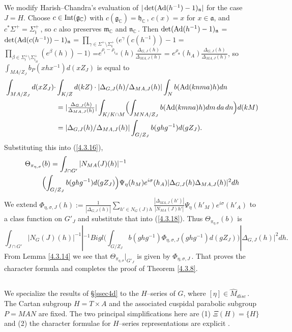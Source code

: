 \documentclass{conm-p-l}
\renewcommand{\gg}{\mathfrak{g}}
\def\ga{\mathfrak{a}}
\def\gg{\mathfrak{g}}
\def\gh{\mathfrak{h}}
\def\gj{\mathfrak{j}}
\def\gm{\mathfrak{m}}
\def\gn{\mathfrak{n}}
\def\gt{\mathfrak{t}}
\def\Int{{\rm Int}}
\def\Ad{{\rm Ad}}
\def\C{\mathbb{C}}
\begin{document}
We modify Harish--Chandra's evaluation \cite[Lemma 12]{HC1966}
of $|\det(\Ad(h^{-1})-1)_\gn|$ for the case $J = H$.  Choose $c \in
\Int(\gg_\C)$ with $c(\gg_\C) = \gh_\C$\,, $c(x) = x$ for 
$x \in \ga$, and $c^*\Sigma^+ = \Sigma^+_\gj$\,, so $c$ also
preserves $\gm_\C$ and $\gn_\C$\,.  Then
$\det(\Ad(h^{-1})-1)_\gn$ = $\det(\Ad(c(h^{-1}))-1)_\gn$
= $\prod_{\gamma \in \Sigma^+\setminus \Sigma^+_\gt} (e^\gamma(c(h^{-1}))-1$
= $\prod_{\beta \in \Sigma^+_\gj \setminus \Sigma^+_{\gj_M}} 
	(e^\beta(h))-1)$
=$e^{\rho_\gj - \rho_{\gj_M}}(h)\frac{\Delta_{G,J}(h)}{\Delta_{MA,J}(h)}$
= $e^{\rho_\ga}(h_A) \frac{\Delta_{G,J}(h)}{\Delta_{MA,J}(h)}$, so
$\int_{MA/Z_J} b_P(xhx^{-1})d(xZ_J)$ is equal to
$$
\begin{aligned}
\int_{MA/Z_J}d(xZ_J)\cdot & \int_{K/Z}d(kZ)\cdot 
	|\Delta_{G,J}(h)/\Delta_{MA,J}(h)| \int_N b(\Ad(knma)h)dn\\
&= |\tfrac{\Delta_{G,J}(h)}{\Delta_{MA,J}(h)}|\int_{K/K\cap M} \Bigl (
	\int_{MNA/Z_J} b(\Ad(kmna)h)dm\,da\,dn\Bigr ) d(kM) \\
&= |\Delta_{G,J}(h)/\Delta_{MA,J}(h)|\int_{G/Z_J} b(ghg^{-1}) d(gZ_J).
\end{aligned}
$$
Substituting this into (\ref{4.3.16}),
\begin{equation}\label{4.3.18}
\begin{aligned}
\Theta_{\pi_{\eta,\sigma}}&(b) = \int_{J\cap G'} |N_{MA}(J)(h)|^{-1} \\
&\Bigl ( \int_{G/Z_J} b(ghg^{-1})d(gZ_J)\Bigr ) \Psi_\eta(h_M)
e^{i\sigma}(h_A)|\Delta_{G,J}(h)\Delta_{MA,J}(h)|^2dh
\end{aligned}
\end{equation}
We extend $\Phi_{\eta,\sigma,J}(h) := \frac{1}{|\Delta_{G,J}(h)|}
\sum_{h' \in N_G(J)h} \frac{|\Delta_{MA,J}(h')|}{|N_{MA}(J)h'|}
\Psi_\eta(h'_M)e^{i\sigma}(h'_A)$ 
to a class function on $G'_J$ and substitute that into (\ref{4.3.18}).
Thus $\Theta_{\pi_{\eta,\sigma}}(b)$ is
$$
\int_{J\cap G'} |N_G(J)(h)|^{-1}|^{-1} Bigl ( \int_{G/Z_J}b(ghg^{-1})
\Phi_{\eta,\sigma,J}(ghg^{-1})d(gZ_J)\Bigr ) |\Delta_{G,J}(h)|^2 dh.
$$
From Lemma \ref{4.3.14} we see that $\Theta_{\pi_{\eta,\sigma}}|_{G'_J}$
is given by $\Phi_{\eta,\sigma,J}$\,.  That proves the character formula
and completes the proof of Theorem \ref{4.3.8}.

\subsection{}\label{ssec4e}\setcounter{equation}{0}
We specialize the results of \S \ref{ssec4d} to the $H$--series of $G$,
where $[\eta] \in \widehat{M}_{disc}$\,.
The Cartan subgroup $H = T\times A$ and the associated cuspidal parabolic
subgroup $P=MAN$ are fixed.  The two principal simplifications here are
(1) $\Xi(H) = \{H\}$ and (2) the character formulae for $H$--series
representations are explicit \cite{HW1986a}.
\end{document}
